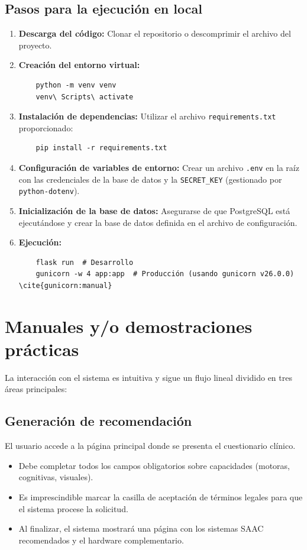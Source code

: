 \subsection{Pasos para la ejecución en local}
\begin{enumerate}
	\item \textbf{Descarga del código:} Clonar el repositorio o descomprimir el archivo del proyecto.
	\item \textbf{Creación del entorno virtual:}
	\begin{verbatim}
	python -m venv venv
	venv\ Scripts\ activate
	\end{verbatim}
	\item \textbf{Instalación de dependencias:} Utilizar el archivo \texttt{requirements.txt} proporcionado:
	\begin{verbatim}
	pip install -r requirements.txt
	\end{verbatim}
	\item \textbf{Configuración de variables de entorno:} Crear un archivo \texttt{.env} en la raíz con las credenciales de la base de datos y la \texttt{SECRET\_KEY} (gestionado por \texttt{python-dotenv}).
	\item \textbf{Inicialización de la base de datos:} Asegurarse de que PostgreSQL está ejecutándose y crear la base de datos definida en el archivo de configuración.
	\item \textbf{Ejecución:}
	\begin{verbatim}
	flask run  # Desarrollo
	gunicorn -w 4 app:app  # Producción (usando gunicorn v26.0.0) \cite{gunicorn:manual}
	\end{verbatim}
\end{enumerate}

\section{Manuales y/o demostraciones prácticas}
La interacción con el sistema es intuitiva y sigue un flujo lineal dividido en tres áreas principales:

\subsection{Generación de recomendación}
El usuario accede a la página principal donde se presenta el cuestionario clínico. 
\begin{itemize}
	\item Debe completar todos los campos obligatorios sobre capacidades (motoras, cognitivas, visuales).
	\item Es imprescindible marcar la casilla de aceptación de términos legales para que el sistema procese la solicitud. \cite{ue:rgpd}
	\item Al finalizar, el sistema mostrará una página con los sistemas SAAC recomendados y el hardware complementario.
\end{itemize}

